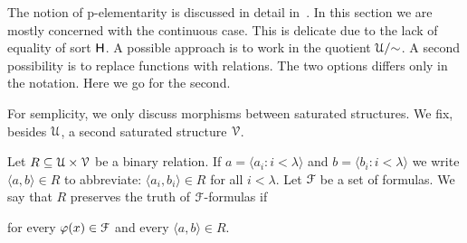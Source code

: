 \documentclass{amsproc}
\begin{document}
{\begin{comment}
\begin{fact}\label{fact_pel_invertible}
  Let ${\EuScript F}$ be a p-dense set of positive formulas. 
  If $f$ preserve the truth of formulas in ${\EuScript F}$, then $\varphi(a)\leftrightarrow\varphi(fa)$ for every $\varphi(x)\in{\EuScript L}^{\rm p}$ and every $a\in({\rm dom }f)^{|x|}$.
\end{fact}

\begin{proof}
  Assume $\neg\varphi(a)$ and apply Proposition~\ref{prop_Fapprox} to infer that  $\psi(fa)$ holds for some $\psi(x)\in{\EuScript L}^{\rm p}$ that implies $\neg\varphi(x)$.
\end{proof}

If $f$ is p-elementary, ${\rm dom}f\subseteq M$, and ${\rm range}f\subseteq N$ then we say that $f:M\rightarrow N$ is p-elementary.
This terminology is convenient but imprecise.
More correctly, in~\cite{clcl} such maps are called \textit{approximate\/} p-elementary.
In fact, from the elementarity of $f:{\EuScript U}\rightarrow{\EuScript U}$ we can (only) infer that

\ceq{\hfill M\models\{\varphi(a)\}'}{\Leftrightarrow}{N\models\{\varphi(fa)\}'.}

As below we always evaluate formulas in ${\EuScript U}$, we can safely drop the modifier \textit{approximate}.
  
\end{comment}

The notion of p-elementarity is discussed in detail in~\cite{clcl}.
In this section we are mostly concerned with the continuous case.
This is delicate due to the lack of equality of sort ${\sf H}$.
A possible approach is to work in the quotient ${\EuScript U}/{\sim}$.
A second possibility is to replace functions with relations.
The two options differs only in the notation.
Here we go for the second.

For semplicity, we only discuss morphisms between saturated structures.
We fix, besides ${\EuScript U}$, a second saturated structure ${\EuScript V}$.

Let $R\mathrel{\subseteq}{\EuScript U}\times{\EuScript V}$ be a binary relation.
If $a=\langle a_i:i<\lambda\rangle$ and $b=\langle b_i:i<\lambda\rangle$ we write $\langle a,b\rangle\in R$ to abbreviate: $\langle a_i,b_i\rangle\in R$ for all $i<\lambda$.
Let ${\EuScript F}$ be a set of formulas.
We say that $R$ preserves the truth of ${\EuScript F}$-formulas if 

\hfill for every $\varphi(x)\in{\EuScript F}$ and every $\langle a,b\rangle\in R$.

}
\end{document}
